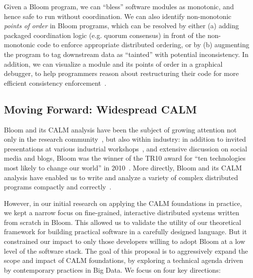 Given a Bloom program, we can ``bless'' software modules as monotonic, and hence safe to run without coordination.  We can also identify non-monotonic \emph{points of order} in Bloom programs, which can be resolved by either (a) adding packaged coordination logic (e.g. quorum consensus) in front of the non-monotonic code to enforce appropriate distributed ordering, or by (b) augmenting the program to tag downstream data as ``tainted'' with potential inconsistency.  In addition, we can visualize a module and its points of order in a graphical debugger, to help programmers reason about restructuring their code for more efficient consistency enforcement~\cite{Alvaro2011}.

\subsection{Moving Forward: Widespread CALM}
Bloom and its CALM analysis have been the subject of growing attention not only in the research community~\cite{Abiteboul2011,Ameloot2011a,Ameloot2011,Zinn2012}, but also within industry: in addition to invited presentations at various industrial workshops~\cite{goto11,langnext12,basho12}, and extensive discussion on social media and blogs, Bloom was the winner of the TR10 award for ``ten technologies most likely to change our world'' in 2010~\cite{tr10}.  More directly, Bloom and its CALM analysis have enabled us to write and analyze a variety of complex distributed programs compactly and correctly~\cite{bud-sandbox}.  

However, in our initial research on applying the CALM foundations in practice,
we kept a narrow focus on fine-grained, interactive distributed systems written
from scratch in Bloom.  This allowed us to validate the utility of our
theoretical framework for building practical software in a carefully designed
language.  But it constrained our impact to only those developers willing to
adopt Bloom at a low level of the software stack.  The goal of this proposal is
to aggressively expand the scope and impact of CALM foundations, by exploring a
technical agenda driven by contemporary practices in Big Data.  We focus on four
key directions:


